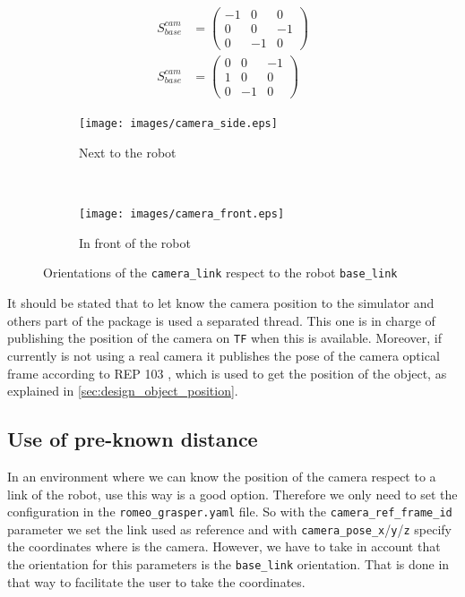 \documentclass[12pt,a4paper,final,twoside,openright]{report}
\begin{document}
\vspace{-20pt}
\begin{eqnarray}
S_{base}^{cam} &= \begin{pmatrix}
-1 & 0 & 0 \\
0 & 0 &-1 \\
0 & -1 & 0
\end{pmatrix} \label{eq:matrix_rot_side}\\
S_{base}^{cam} &= \begin{pmatrix}
0 & 0 & -1 \\
1 & 0 & 0 \\
0 & -1 & 0
\end{pmatrix}\label{eq:matrix_rot_front}
\end{eqnarray}

\begin{figure}[h]
\begin{subfigure}[r]{0.48\textwidth}
\centering
		\texttt{[image: images/camera\_side.eps]}
        \caption{Next to the robot \label{fig:camera_side}}
\end{subfigure}
~
\begin{subfigure}[r]{0.48\textwidth}
\centering
		\texttt{[image: images/camera\_front.eps]}
        \caption{In front of the robot \label{fig:camera_front}}
\end{subfigure}
\caption{Orientations of the \texttt{camera\_link} respect to the robot \texttt{base\_link}}
\end{figure}

It should be stated that to let know the camera position to the simulator and others part of the package is used a separated thread. This one is in charge of publishing the position of the camera on \texttt{TF} when this is available. Moreover, if currently is not using a real camera it publishes the pose of the camera optical frame according to REP 103 \cite{Foote}, which is used to get the position of the object, as explained in \ref{sec:design_object_position}.

\subsection{Use of pre-known distance}
\label{sec:pre-known_distance}
In an environment where we can know the position of the camera respect to a link of the robot, use this way is a good option. Therefore we only need to set the configuration in the \texttt{romeo\_grasper.yaml} file. So with the \texttt{camera\_ref\_frame\_id} parameter we set the link used as reference and with \texttt{camera\_pose\_x}/\texttt{y}/\texttt{z} specify the coordinates where is the camera. However, we have to take in account that the orientation for this parameters is the \texttt{base\_link} orientation. That is done in that way to facilitate the user to take the coordinates.
\end{document}
